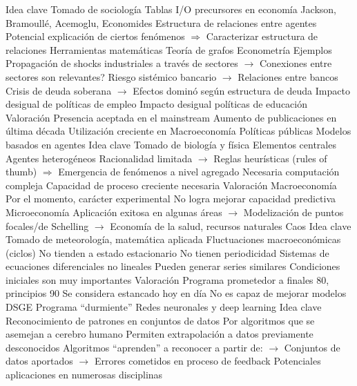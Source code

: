 \documentclass{nuevotema}
\begin{document}
\begin{esquemal}
			\3 Idea clave
				\4 Tomado de sociología
				\4[] Tablas I/O precursores en economía
				\4 Jackson, Bramoullé, Acemoglu, Economides
				\4 Estructura de relaciones entre agentes
				\4[] Potencial explicación de ciertos fenómenos
				\4[] $\Rightarrow$ Caracterizar estructura de relaciones
				\4 Herramientas matemáticas
				\4[] Teoría de grafos
				\4[] Econometría
				\4 Ejemplos
				\4[] Propagación de shocks industriales a través de sectores
				\4[] $\to$ Conexiones entre sectores son relevantes?
				\4[] Riesgo sistémico bancario
				\4[] $\to$ Relaciones entre bancos
				\4[] Crisis de deuda soberana
				\4[] $\to$ Efectos dominó según estructura de deuda
				\4[] Impacto desigual de políticas de empleo
				\4[] Impacto desigual políticas de educación
			\3 Valoración
				\4 Presencia aceptada en el mainstream
				\4 Aumento de publicaciones en última década
				\4 Utilización creciente en
				\4[] Macroeconomía
				\4[] Políticas públicas
		\2 Modelos basados en agentes
			\3 Idea clave
				\4 Tomado de biología y física
				\4 Elementos centrales
				\4[] Agentes heterogéneos
				\4[] Racionalidad limitada
				\4[] $\to$ Reglas heurísticas (rules of thumb)
				\4[] $\Rightarrow$ Emergencia de fenómenos a nivel agregado
				\4 Necesaria computación compleja
				\4[] Capacidad de proceso creciente necesaria
			\3 Valoración
				\4 Macroeconomía
				\4[] Por el momento, carácter experimental
				\4[] No logra mejorar capacidad predictiva
				\4 Microeconomía
				\4[] Aplicación exitosa en algunas áreas
				\4[] $\to$ Modelización de puntos focales/de Schelling
				\4[] $\to$ Economía de la salud, recursos naturales
		\2 Caos
			\3 Idea clave
				\4 Tomado de meteorología, matemática aplicada
				\4 Fluctuaciones macroeconómicas (ciclos)
				\4[] No tienden a estado estacionario
				\4[] No tienen periodicidad
				\4 Sistemas de ecuaciones diferenciales no lineales
				\4[] Pueden generar series similares
				\4[] Condiciones iniciales son muy importantes
			\3 Valoración
				\4 Programa prometedor a finales 80, principios 90
				\4 Se considera estancado hoy en día
				\4[] No es capaz de mejorar modelos DSGE
				\4 Programa ``durmiente''
		\2 Redes neuronales y deep learning
			\3 Idea clave
				\4 Reconocimiento de patrones en conjuntos de datos
				\4[] Por algoritmos que se asemejan a cerebro humano
				\4[] Permiten extrapolación a datos previamente desconocidos
				\4[] Algoritmos ``aprenden'' a reconocer a partir de:
				\4[] $\to$ Conjuntos de datos aportados
				\4[] $\to$ Errores cometidos en proceso de feedback
				\4 Potenciales aplicaciones en numerosas disciplinas

\end{esquemal}
\end{document}
